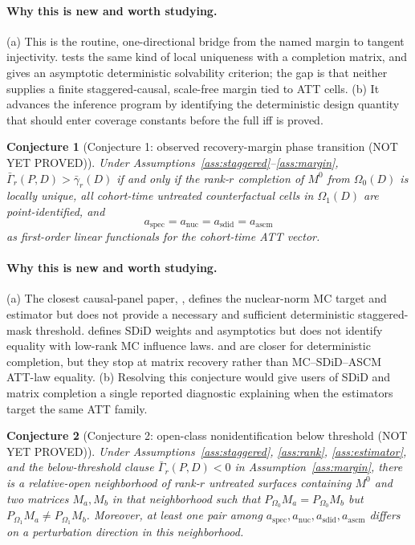 \documentclass[11pt]{article}
\theoremstyle{definition}
\theoremstyle{plain}
\newtheorem{conjecture}{Conjecture}
\theoremstyle{remark}
\begin{document}
\paragraph{Why this is new and worth studying.}
(a) This is the routine, one-directional bridge from the named margin to
tangent injectivity. \citet[Sections~2--4]{SingerCucuringu2010} tests the same
kind of local uniqueness with a completion matrix, and
\citet[Theorem~1.3]{Chatterjee2020} gives an asymptotic deterministic
solvability criterion; the gap is that neither supplies a finite
staggered-causal, scale-free margin tied to ATT cells. (b) It advances the
\citet{YanWainwright2024} inference program by identifying the deterministic
design quantity that should enter coverage constants before the full iff is
proved.

\begin{conjecture}[Conjecture 1: observed recovery-margin phase transition (NOT YET PROVED)]
\label{conj:phase}
Under Assumptions~\ref{ass:staggered}--\ref{ass:margin},
$\bar\Gamma_r(P,D)>\bar\gamma_r(D)$ if and only if the rank-$r$ completion of
$M^0$ from $\Omega_0(D)$ is locally unique, all cohort-time untreated
counterfactual cells in $\Omega_1(D)$ are point-identified, and
\[
a_{\mathrm{spec}}=a_{\mathrm{nuc}}=a_{\mathrm{sdid}}=a_{\mathrm{ascm}}
\]
as first-order linear functionals for the cohort-time ATT vector.
\end{conjecture}
\paragraph{Why this is new and worth studying.}
(a) The closest causal-panel paper,
\citet[Sections~2--3]{AtheyBayatiDoudchenkoImbensKhosravi2021}, defines the
nuclear-norm MC target and estimator but does not provide a necessary and
sufficient deterministic staggered-mask threshold. \citet[Sections~2--3]{ArkhangelskyAtheyHirshbergImbensWager2021}
defines SDiD weights and asymptotics but does not identify equality with
low-rank MC influence laws. \citet[Sections~2--4]{SingerCucuringu2010} and
\citet[Theorem~1.3]{Chatterjee2020} are closer for deterministic completion,
but they stop at matrix recovery rather than MC--SDiD--ASCM ATT-law equality.
(b) Resolving this conjecture would give users of SDiD and matrix completion a
single reported diagnostic explaining when the estimators target the same ATT
family.

\begin{conjecture}[Conjecture 2: open-class nonidentification below threshold (NOT YET PROVED)]
\label{conj:separation}
Under Assumptions~\ref{ass:staggered}, \ref{ass:rank}, \ref{ass:estimator},
and the below-threshold clause $\bar\Gamma_r(P,D)<0$ in
Assumption~\ref{ass:margin}, there is a relative-open neighborhood of
rank-$r$ untreated surfaces containing $M^0$ and two matrices $M_a,M_b$ in
that neighborhood such that $P_{\Omega_0}M_a=P_{\Omega_0}M_b$ but
$P_{\Omega_1}M_a\ne P_{\Omega_1}M_b$. Moreover, at least one pair among
$a_{\mathrm{spec}},a_{\mathrm{nuc}},a_{\mathrm{sdid}},a_{\mathrm{ascm}}$
differs on a perturbation direction in this neighborhood.
\end{conjecture}
\end{document}
